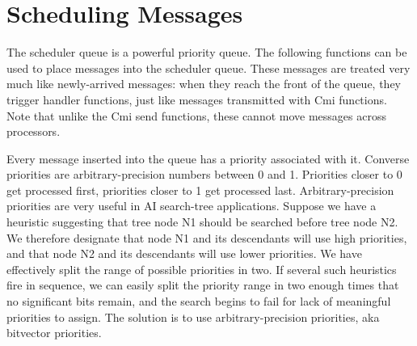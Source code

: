 

\section{Scheduling Messages}
\label{schedqueue}

The scheduler queue is a powerful priority queue.  The following
functions can be used to place messages into the scheduler queue.
These messages are treated very much like newly-arrived messages: when
they reach the front of the queue, they trigger handler functions,
just like messages transmitted with Cmi functions.  Note that unlike
the Cmi send functions, these cannot move messages across processors.

Every message inserted into the queue has a priority associated with
it.  Converse priorities are arbitrary-precision numbers between 0 and
1.  Priorities closer to 0 get processed first, priorities closer to 1
get processed last.  Arbitrary-precision priorities are very useful in
AI search-tree applications. Suppose we have a heuristic suggesting
that tree node N1 should be searched before tree node N2. We therefore
designate that node N1 and its descendants will use high priorities,
and that node N2 and its descendants will use lower priorities. We
have effectively split the range of possible priorities in two. If
several such heuristics fire in sequence, we can easily split the
priority range in two enough times that no significant bits remain,
and the search begins to fail for lack of meaningful priorities to
assign. The solution is to use arbitrary-precision priorities, aka
bitvector priorities.

